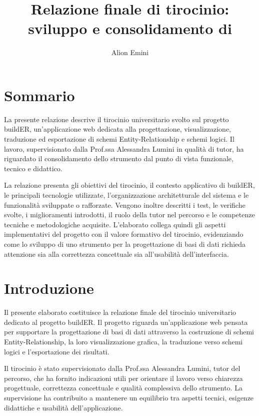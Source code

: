 \documentclass{unipd-thesis-modern}
\title{Relazione finale di tirocinio:\\ sviluppo e consolidamento di \builder}
\author{Alion Emini}
\newcommand{\builder}{buildER}
\begin{document}

\makecover
\cleardoublepage

\chapter*{Sommario}

La presente relazione descrive il tirocinio universitario svolto sul progetto \builder, un'applicazione web dedicata alla progettazione, visualizzazione, traduzione ed esportazione di schemi Entity-Relationship e schemi logici. Il lavoro, supervisionato dalla Prof.ssa Alessandra Lumini in qualità di tutor, ha riguardato il consolidamento dello strumento dal punto di vista funzionale, tecnico e didattico.

La relazione presenta gli obiettivi del tirocinio, il contesto applicativo di \builder, le principali tecnologie utilizzate, l'organizzazione architetturale del sistema e le funzionalità sviluppate o rafforzate. Vengono inoltre descritti i test, le verifiche svolte, i miglioramenti introdotti, il ruolo della tutor nel percorso e le competenze tecniche e metodologiche acquisite. L'elaborato collega quindi gli aspetti implementativi del progetto con il valore formativo del tirocinio, evidenziando come lo sviluppo di uno strumento per la progettazione di basi di dati richieda attenzione sia alla correttezza concettuale sia all'usabilità dell'interfaccia.

\cleardoublepage

{\hypersetup{linkcolor=black}
\tableofcontents}
\cleardoublepage

\mainmatter

\chapter{Introduzione}

Il presente elaborato costituisce la relazione finale del tirocinio universitario dedicato al progetto \builder. Il progetto riguarda un'applicazione web pensata per supportare la progettazione di basi di dati attraverso la costruzione di schemi Entity-Relationship, la loro visualizzazione grafica, la traduzione verso schemi logici e l'esportazione dei risultati.

Il tirocinio è stato supervisionato dalla Prof.ssa Alessandra Lumini, tutor del percorso, che ha fornito indicazioni utili per orientare il lavoro verso chiarezza progettuale, correttezza concettuale e qualità complessiva dello strumento. La supervisione ha contribuito a mantenere un equilibrio tra aspetti tecnici, esigenze didattiche e usabilità dell'applicazione.
\end{document}
